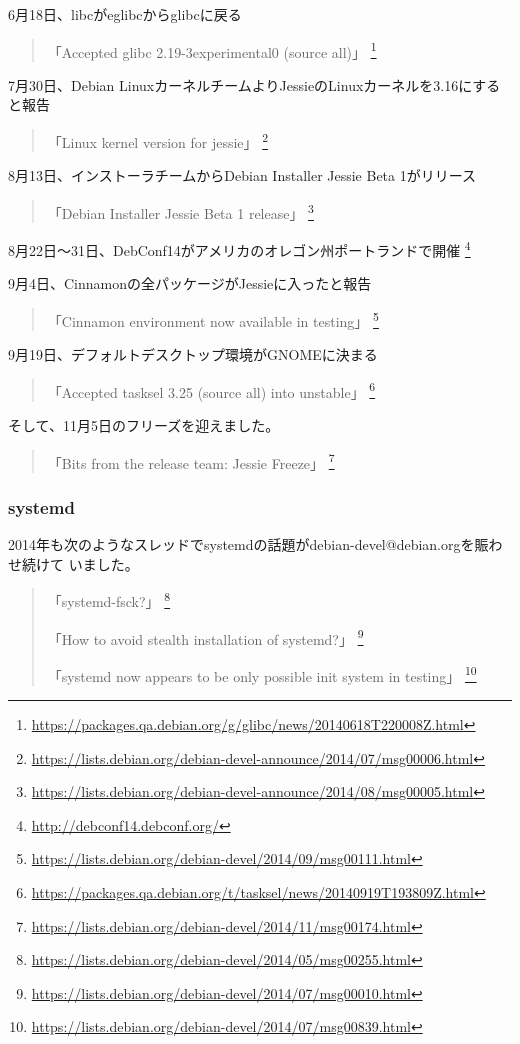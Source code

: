 \documentclass[mingoth,a4paper]{jsarticle}
\begin{document}
6月18日、libcがeglibcからglibcに戻る
\begin{quote}
  「Accepted glibc 2.19-3experimental0 (source all)」
  \footnote{\url{https://packages.qa.debian.org/g/glibc/news/20140618T220008Z.html}}
\end{quote}

7月30日、Debian LinuxカーネルチームよりJessieのLinuxカーネルを3.16にすると報告
\begin{quote}
  「Linux kernel version for jessie」
  \footnote{\url{https://lists.debian.org/debian-devel-announce/2014/07/msg00006.html}}
\end{quote}

8月13日、インストーラチームからDebian Installer Jessie Beta 1がリリース
\begin{quote}
  「Debian Installer Jessie Beta 1 release」
  \footnote{\url{https://lists.debian.org/debian-devel-announce/2014/08/msg00005.html}}
\end{quote}

8月22日〜31日、DebConf14がアメリカのオレゴン州ポートランドで開催
\footnote{\url{http://debconf14.debconf.org/}}

9月4日、Cinnamonの全パッケージがJessieに入ったと報告
\begin{quote}
  「Cinnamon environment now available in testing」
  \footnote{\url{https://lists.debian.org/debian-devel/2014/09/msg00111.html}}
\end{quote}

9月19日、デフォルトデスクトップ環境がGNOMEに決まる
\begin{quote}
  「Accepted tasksel 3.25 (source all) into unstable」
  \footnote{\url{https://packages.qa.debian.org/t/tasksel/news/20140919T193809Z.html}}
\end{quote}

そして、11月5日のフリーズを迎えました。
\begin{quote}
  「Bits from the release team: Jessie Freeze」
  \footnote{\url{https://lists.debian.org/debian-devel/2014/11/msg00174.html}}
\end{quote}


\subsubsection{systemd}

2014年も次のようなスレッドでsystemdの話題がdebian-devel@debian.orgを賑わせ続けて
いました。

\begin{quote}
  「systemd-fsck?」
  \footnote{\url{https://lists.debian.org/debian-devel/2014/05/msg00255.html}}

  「How to avoid stealth installation of systemd?」
  \footnote{\url{https://lists.debian.org/debian-devel/2014/07/msg00010.html}}

  「systemd now appears to be only possible init system in testing」
  \footnote{\url{https://lists.debian.org/debian-devel/2014/07/msg00839.html}}
\end{quote}
\end{document}
